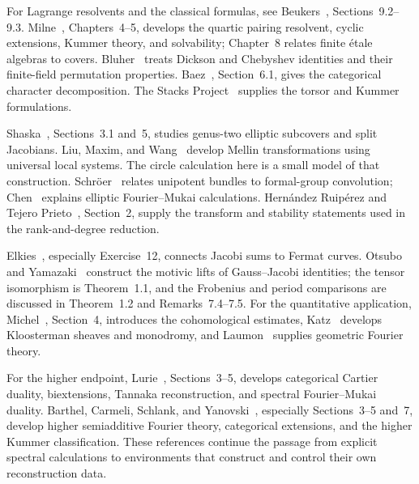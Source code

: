 \documentclass[11pt]{article}
\theoremstyle{remark}
\begin{document}
For Lagrange resolvents and the classical formulas, see Beukers~\cite{beukers}, Sections~9.2--9.3. Milne~\cite{milne}, Chapters~4--5, develops the quartic pairing resolvent, cyclic extensions, Kummer theory, and solvability; Chapter~8 relates finite \'etale algebras to covers. Bluher~\cite{bluher} treats Dickson and Chebyshev identities and their finite-field permutation properties. Baez~\cite{baez}, Section~6.1, gives the categorical character decomposition. The Stacks Project~\cite{stacks-kummer,stacks-torsors} supplies the torsor and Kummer formulations.

Shaska~\cite{shaska-split}, Sections~3.1 and~5, studies genus-two elliptic subcovers and split Jacobians. Liu, Maxim, and Wang~\cite{liu-maxim-wang-mellin} develop Mellin transformations using universal local systems. The circle calculation here is a small model of that construction. Schr\"oer~\cite{schroer} relates unipotent bundles to formal-group convolution; Chen~\cite{chen} explains elliptic Fourier--Mukai calculations. Hern\'andez Ruip\'erez and Tejero Prieto~\cite{ruiperez-tejero}, Section~2, supply the transform and stability statements used in the rank-and-degree reduction.

Elkies~\cite{elkies-gauss}, especially Exercise~12, connects Jacobi sums to Fermat curves. Otsubo and Yamazaki~\cite{otsubo-yamazaki} construct the motivic lifts of Gauss--Jacobi identities; the tensor isomorphism is Theorem~1.1, and the Frobenius and period comparisons are discussed in Theorem~1.2 and Remarks~7.4--7.5. For the quantitative application, Michel~\cite{michel-applied}, Section~4, introduces the cohomological estimates, Katz~\cite{katz} develops Kloosterman sheaves and monodromy, and Laumon~\cite{laumon} supplies geometric Fourier theory.

For the higher endpoint, Lurie~\cite{lurie-elliptic}, Sections~3--5, develops categorical Cartier duality, biextensions, Tannaka reconstruction, and spectral Fourier--Mukai duality. Barthel, Carmeli, Schlank, and Yanovski~\cite{chromatic}, especially Sections~3--5 and~7, develop higher semiadditive Fourier theory, categorical extensions, and the higher Kummer classification. These references continue the passage from explicit spectral calculations to environments that construct and control their own reconstruction data.
\end{document}
